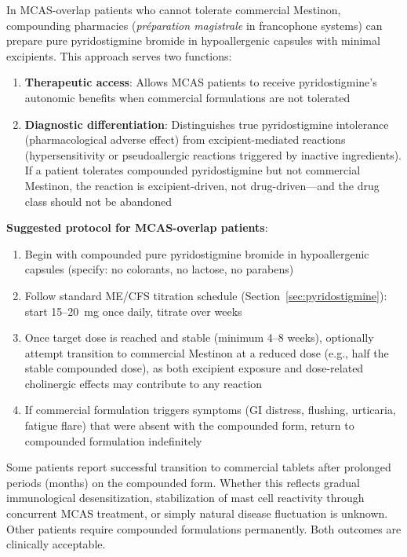 \begin{observation}
\label{obs:pyridostigmine-compounding}
In MCAS-overlap patients who cannot tolerate commercial Mestinon, compounding pharmacies (\emph{préparation magistrale} in francophone systems) can prepare pure pyridostigmine bromide in hypoallergenic capsules with minimal excipients. This approach serves two functions:

\begin{enumerate}
    \item \textbf{Therapeutic access}: Allows MCAS patients to receive pyridostigmine's autonomic benefits when commercial formulations are not tolerated
    \item \textbf{Diagnostic differentiation}: Distinguishes true pyridostigmine intolerance (pharmacological adverse effect) from excipient-mediated reactions (hypersensitivity or pseudoallergic reactions triggered by inactive ingredients). If a patient tolerates compounded pyridostigmine but not commercial Mestinon, the reaction is excipient-driven, not drug-driven---and the drug class should not be abandoned
\end{enumerate}
\end{observation}

\textbf{Suggested protocol for MCAS-overlap patients}:
\begin{enumerate}
    \item Begin with compounded pure pyridostigmine bromide in hypoallergenic capsules (specify: no colorants, no lactose, no parabens)
    \item Follow standard ME/CFS titration schedule (Section~\ref{sec:pyridostigmine}): start 15--20~mg once daily, titrate over weeks
    \item Once target dose is reached and stable (minimum 4--8 weeks), optionally attempt transition to commercial Mestinon at a reduced dose (e.g., half the stable compounded dose), as both excipient exposure and dose-related cholinergic effects may contribute to any reaction
    \item If commercial formulation triggers symptoms (GI distress, flushing, urticaria, fatigue flare) that were absent with the compounded form, return to compounded formulation indefinitely
\end{enumerate}

Some patients report successful transition to commercial tablets after prolonged periods (months) on the compounded form. Whether this reflects gradual immunological desensitization, stabilization of mast cell reactivity through concurrent MCAS treatment, or simply natural disease fluctuation is unknown. Other patients require compounded formulations permanently. Both outcomes are clinically acceptable.

